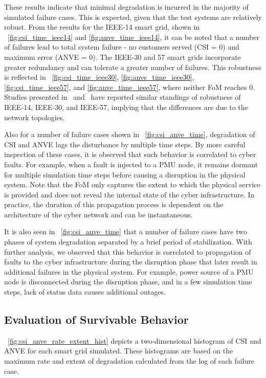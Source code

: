 \documentclass[review]{elsarticle}
\begin{document}
These results indicate that minimal degradation is incurred in the majority of simulated failure cases. This is expected, given that the test systems are relatively robust. From the results for the IEEE-14 smart grid, shown in \figurename~\ref{fig:csi_time_ieee14} and \ref{fig:anve_time_ieee14}, it can be noted that a number of failures lead to total system failure - no customers served (CSI = 0) and maximum error (ANVE = 0). The IEEE-30 and 57 smart grids incorporate greater redundancy and can tolerate a greater number of failures. This robustness is reflected in \figurename~\ref{fig:csi_time_ieee30}, \ref{fig:anve_time_ieee30}, \ref{fig:csi_time_ieee57}, and \ref{fig:anve_time_ieee57}, where neither FoM reaches 0. Studies presented in~\cite{AlB17} and~\cite{SrE18} have reported similar standings of robustness of IEEE-14, IEEE-30, and IEEE-57, implying that the differences are due to the network topologies.

Also for a number of failure cases shown in \figurename~\ref{fig:csi_anve_time}, degradation of CSI and ANVE lags the disturbance by multiple time steps. By more careful inspection of these cases, it is observed that such behavior is correlated to cyber faults. For example, when a fault is injected to a PMU node, it remains dormant for multiple simulation time steps before causing a disruption in the physical system. Note that the FoM only captures the extent to which the physical service is provided and does not reveal the internal state of the cyber infrastructure. In practice, the duration of this propagation process is dependent on the architecture of the cyber network and can be instantaneous.

It is also seen in \figurename~\ref{fig:csi_anve_time} that a number of failure cases have two phases of system degradation separated by a brief period of stabilization. With further analysis, we observed that this behavior is correlated to propagation of faults to the cyber infrastructure during the disruption phase that later result in additional failures in the physical system. For example, power source of a PMU node is disconnected during the disruption phase, and in a few simulation time steps, lack of status data causes additional outages.

\subsection{Evaluation of Survivable Behavior}
\label{sec:case_study:surv_eval}
\figurename~\ref{fig:csi_anve_rate_extent_hist} depicts a two-dimensional histogram of CSI and ANVE for each smart grid simulated. These histograms are based on the maximum rate and extent of degradation calculated from the log of each failure case.
\end{document}
